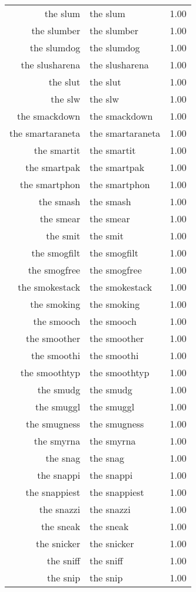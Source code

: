 \begin{table}[ht]
\begin{tabular}{rlr}
  the slum & the slum & 1.00 \\ 
  the slumber & the slumber & 1.00 \\ 
  the slumdog & the slumdog & 1.00 \\ 
  the slusharena & the slusharena & 1.00 \\ 
  the slut & the slut & 1.00 \\ 
  the slw & the slw & 1.00 \\ 
  the smackdown & the smackdown & 1.00 \\ 
  the smartaraneta & the smartaraneta & 1.00 \\ 
  the smartit & the smartit & 1.00 \\ 
  the smartpak & the smartpak & 1.00 \\ 
  the smartphon & the smartphon & 1.00 \\ 
  the smash & the smash & 1.00 \\ 
  the smear & the smear & 1.00 \\ 
  the smit & the smit & 1.00 \\ 
  the smogfilt & the smogfilt & 1.00 \\ 
  the smogfree & the smogfree & 1.00 \\ 
  the smokestack & the smokestack & 1.00 \\ 
  the smoking & the smoking & 1.00 \\ 
  the smooch & the smooch & 1.00 \\ 
  the smoother & the smoother & 1.00 \\ 
  the smoothi & the smoothi & 1.00 \\ 
  the smoothtyp & the smoothtyp & 1.00 \\ 
  the smudg & the smudg & 1.00 \\ 
  the smuggl & the smuggl & 1.00 \\ 
  the smugness & the smugness & 1.00 \\ 
  the smyrna & the smyrna & 1.00 \\ 
  the snag & the snag & 1.00 \\ 
  the snappi & the snappi & 1.00 \\ 
  the snappiest & the snappiest & 1.00 \\ 
  the snazzi & the snazzi & 1.00 \\ 
  the sneak & the sneak & 1.00 \\ 
  the snicker & the snicker & 1.00 \\ 
  the sniff & the sniff & 1.00 \\ 
  the snip & the snip & 1.00 \\ 

\end{tabular}
\end{table}
